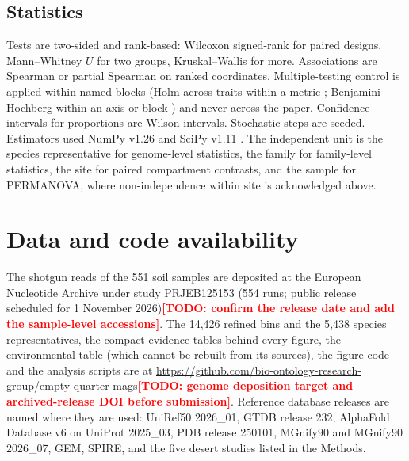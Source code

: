 \documentclass[11pt]{article}
\providecommand{\todo}[1]{\textcolor{red}{\textbf{[TODO: #1]}}}
\begin{document}
\subsection*{Statistics}
Tests are two-sided and rank-based: Wilcoxon signed-rank for paired designs, Mann--Whitney $U$ for
two groups, Kruskal--Wallis for more. Associations are Spearman or partial Spearman on ranked
coordinates. Multiple-testing control is applied within named blocks (Holm across traits within a
metric \citep{holm1979multiple}; Benjamini--Hochberg within an axis or block \citep{benjamini1995fdr})
and never across the paper. Confidence intervals for proportions are Wilson intervals. Stochastic
steps are seeded. Estimators used NumPy v1.26 \citep{harris2020numpy} and SciPy v1.11
\citep{virtanen2020scipy}. The independent unit is the species representative for genome-level
statistics, the family for family-level statistics, the site for paired compartment contrasts, and
the sample for PERMANOVA, where non-independence within site is acknowledged above.

\section*{Data and code availability}
The shotgun reads of the 551 soil samples are deposited at the European Nucleotide Archive under
study PRJEB125153 (554 runs; public release scheduled for 1 November 2026)\todo{confirm the release
date and add the sample-level accessions}. The 14{,}426 refined bins and the 5{,}438 species
representatives, the compact evidence tables behind every figure, the environmental table (which
cannot be rebuilt from its sources), the figure code and the analysis scripts are at
\url{https://github.com/bio-ontology-research-group/empty-quarter-mags}\todo{genome deposition
target and archived-release DOI before submission}. Reference database releases are named where
they are used: UniRef50 2026\_01, GTDB release 232, AlphaFold Database v6 on UniProt 2025\_03, PDB
release 250101, MGnify90 and MGnify90 2026\_07, GEM, SPIRE, and the five desert studies listed in
the Methods.

\end{document}
